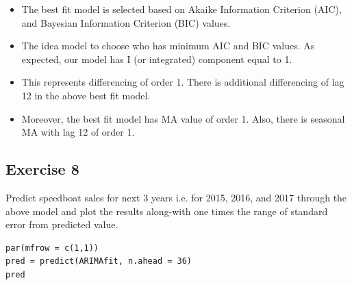 \documentclass[a4paper,12pt]{article}
\begin{document}
\newpage 
\begin{itemize}
    \item The best fit model is selected based on Akaike Information Criterion (AIC), and Bayesian Information
Criterion (BIC) values. 
    \item The idea model to choose who has minimum AIC and BIC values.
As expected, our model has I (or integrated) component equal to 1. 
    \item This represents differencing of
order 1. There is additional differencing of lag 12 in the above best fit model. 
    \item  Moreover, the best fit
model has MA value of order 1. Also, there is seasonal MA with lag 12 of order 1.
\end{itemize}


\newpage 


\subsection*{Exercise 8}
Predict speedboat sales for next 3 years i.e. for 2015, 2016, and 2017 through the above
model and plot the results along-with one times the range of standard error from
predicted value. 



\begin{framed}
\begin{verbatim}
par(mfrow = c(1,1))
pred = predict(ARIMAfit, n.ahead = 36)
pred
\end{verbatim}
\end{framed}
\end{document}
